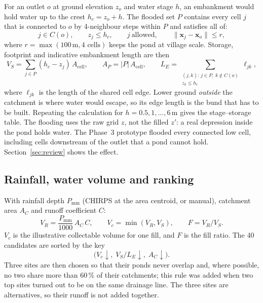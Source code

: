 \documentclass[11pt,a4paper]{article}
\begin{document}
For an outlet $o$ at ground elevation $z_o$ and water stage $h$, an embankment would hold water up to the crest $h_c = z_o + h$. The flooded set $P$ contains every cell $j$ that is connected to $o$ by 4-neighbour steps within $P$ and satisfies all of:
\begin{equation}
j\in C(o),\qquad z_j \le h_c,\qquad j\ \text{allowed},\qquad \lVert \mathbf{x}_j-\mathbf{x}_o\rVert \le r,
\label{eq:flooded}
\end{equation}
where $r = \max(100\,\text{m}, 4\text{ cells})$ keeps the pond at village scale. Storage, footprint and indicative embankment length are then
\begin{equation}
V_S = \sum_{j\in P}(h_c - z_j)\,A_{\mathrm{cell}},\qquad A_P = |P|\,A_{\mathrm{cell}},\qquad
L_E = \sum_{\substack{(j,k):\, j\in P,\ k\notin C(o)\\ z_k\le h_c}} \ell_{jk},
\label{eq:storage}
\end{equation}
where $\ell_{jk}$ is the length of the shared cell edge. Lower ground \emph{outside} the catchment is where water would escape, so its edge length is the bund that has to be built. Repeating the calculation for $h = 0.5,1,\dots,6$\,m gives the stage--storage table. The flooding uses the raw grid $z$, not the filled $z'$: a real depression inside the pond holds water. The Phase~3 prototype flooded every connected low cell, including cells downstream of the outlet that a pond cannot hold. Section~\ref{sec:review} shows the effect.

\subsection{Rainfall, water volume and ranking}
With rainfall depth $P_{\mathrm{mm}}$ (CHIRPS at the area centroid, or manual), catchment area $A_C$ and runoff coefficient $C$:
\begin{equation}
V_R = \frac{P_{\mathrm{mm}}}{1000}\,A_C\,C,\qquad V_c = \min(V_R, V_S),\qquad F = V_R / V_S.
\label{eq:runoff}
\end{equation}
$V_c$ is the illustrative collectable volume for one fill, and $F$ is the fill ratio. The 40 candidates are sorted by the key
\[
\bigl(V_c\downarrow,\; V_S/L_E\downarrow,\; A_C\downarrow\bigr).
\]
Three sites are then chosen so that their ponds never overlap and, where possible, no two share more than 60\,\% of their catchments; this rule was added when two top sites turned out to be on the same drainage line. The three sites are alternatives, so their runoff is not added together.
\end{document}
